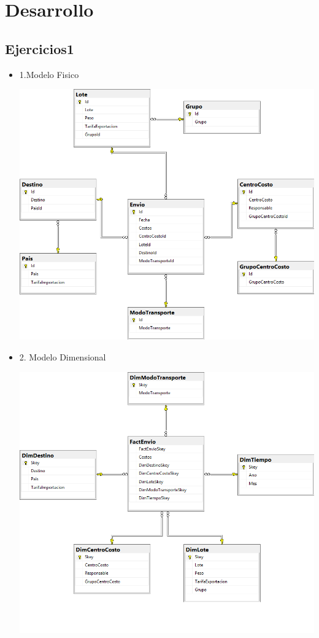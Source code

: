 \section{Desarrollo } 

\subsection {Ejercicios1}
\begin{itemize}
 \item 1.Modelo Fisico
	\begin{center}
	\includegraphics[width=18cm]{./Imagenes/mf1}
	\end{center}	
\newpage
 \item 2. Modelo Dimensional
	\begin{center}
	\includegraphics[width=18cm]{./Imagenes/md1}
	\end{center}	
\newpage
\end{itemize}
